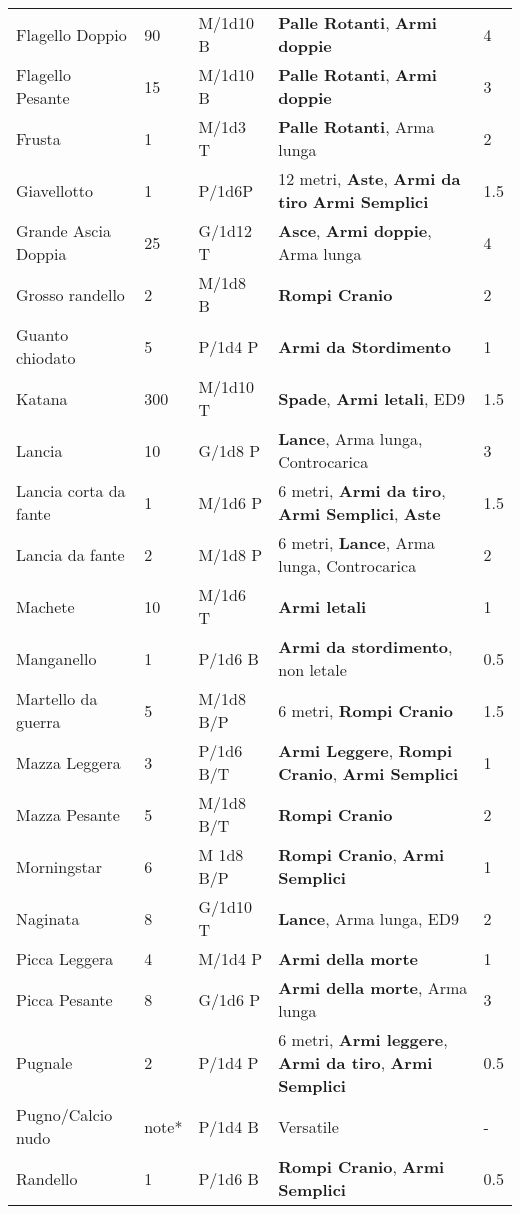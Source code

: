 \documentclass[a4paper,12 pt,openany]{book}
\begin{document}
\begin{textblock*}{19.5cm}
\begin{tabular}{lllll}
Flagello Doppio& 90 & M/1d10 B& \textbf{Palle Rotanti}, \textbf{Armi doppie} & 4\\
Flagello Pesante& 15 & M/1d10 B& \textbf{Palle Rotanti}, \textbf{Armi doppie}& 3\\
Frusta& 1& M/1d3 T& \textbf{Palle Rotanti}, Arma lunga& 2\\
Giavellotto& 1& P/1d6P& 12 metri, \textbf{Aste}, \textbf{Armi da tiro} \textbf{Armi Semplici}& 1.5\\
Grande Ascia Doppia& 25 & G/1d12 T& \textbf{Asce}, \textbf{Armi doppie}, Arma lunga& 4\\
Grosso randello& 2& M/1d8 B&\textbf{Rompi Cranio}& 2\\
Guanto chiodato& 5& P/1d4 P&\textbf{Armi da Stordimento}& 1\\
Katana& 300& M/1d10 T& \textbf{Spade}, \textbf{Armi letali}, ED9& 1.5\\
Lancia& 10 & G/1d8 P&\textbf{Lance}, Arma lunga, Controcarica& 3\\
Lancia corta da fante& 1& M/1d6 P& 6 metri, \textbf{Armi da tiro}, \textbf{Armi Semplici}, \textbf{Aste} & 1.5\\
Lancia da fante& 2& M/1d8 P&6 metri, \textbf{Lance}, Arma lunga, Controcarica& 2 \\
Machete& 10 & M/1d6 T&\textbf{Armi letali} & 1\\
Manganello& 1& P/1d6 B& \textbf{Armi da stordimento}, non letale& 0.5\\
Martello da guerra& 5& M/1d8 B/P& 6 metri, \textbf{Rompi Cranio}& 1.5\\
Mazza Leggera& 3& P/1d6 B/T& \textbf{Armi Leggere}, \textbf{Rompi Cranio}, \textbf{Armi Semplici}&1\\
Mazza Pesante& 5& M/1d8 B/T& \textbf{Rompi Cranio}& 2\\
Morningstar& 6& M 1d8 B/P&\textbf{Rompi Cranio},\textbf{ Armi Semplici}& 1\\
Naginata& 8& G/1d10 T&\textbf{Lance}, Arma lunga, ED9& 2\\
Picca Leggera& 4& M/1d4 P&\textbf{Armi della morte}& 1\\
Picca Pesante& 8& G/1d6 P&\textbf{Armi della morte}, Arma lunga& 3\\
Pugnale& 2& P/1d4 P& 6 metri, \textbf{Armi leggere}, \textbf{Armi da tiro}, \textbf{Armi Semplici}& 0.5\\
Pugno/Calcio nudo& note*& P/1d4 B&Versatile& -\\
Randello& 1& P/1d6 B&\textbf{Rompi Cranio}, \textbf{Armi Semplici}& 0.5\\

\end{tabular}
\end{textblock*}
\end{document}
